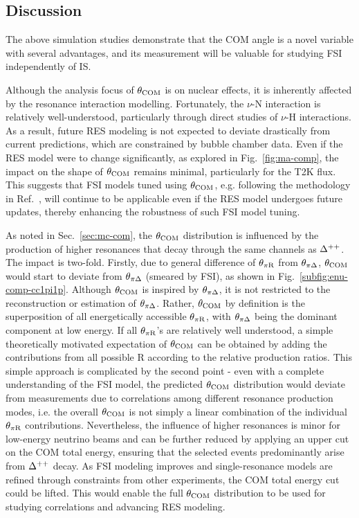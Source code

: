      \subsection{Discussion}
     \label{sec:dis}
     The above simulation studies demonstrate that the COM angle is a novel variable with several advantages, and its measurement will be valuable for studying FSI independently of IS.

     Although the analysis focus of $\theta_{\textrm{COM}}$ is on nuclear effects, it is inherently affected by the resonance interaction modelling. 
     Fortunately, the $\nu$-N interaction is relatively well-understood, particularly through direct studies of $\nu$-H interactions. 
     As a result, future RES modeling is not expected to deviate drastically from current predictions, which are constrained by bubble chamber data.
     Even if the RES model were to change significantly, as explored in Fig.~\ref{fig:ma-comp}, the impact on the shape of $\theta_{\textrm{COM}}$ remains minimal, particularly for the T2K flux.
     This suggests that FSI models tuned using $\theta_{\textrm{COM}}$, e.g. following the methodology in Ref.~\cite{GENIE:2021zuu}, will continue to be applicable even if the RES model undergoes future updates, thereby enhancing the robustness of such FSI model tuning.

     As noted in Sec.~\ref{sec:mc-com}, the $\theta_{\textrm{COM}}$ distribution is influenced by the production of higher resonances that decay through the same channels as $\Delta^{++}$.
     The impact is two-fold.
     Firstly, due to general difference of $\theta_{\pi\textrm{R}}$ from $\theta_{\pi\Delta}$, $\theta_{\textrm{COM}}$ would start to deviate from $\theta_{\pi\Delta}$ (smeared by FSI), as shown in Fig.~\ref{subfig:enu-comp-cc1pi1p}. 
     Although $\theta_{\textrm{COM}}$ is inspired by $\theta_{\pi\Delta}$, it is not restricted to the reconstruction or estimation of $\theta_{\pi\Delta}$. 
     Rather, $\theta_{\textrm{COM}}$ by definition is the superposition of all energetically accessible $\theta_{\pi\textrm{R}}$, with $\theta_{\pi\Delta}$ being the dominant component at low energy.
     If all $\theta_{\pi\textrm{R}}$'s are relatively well understood, a simple theoretically motivated expectation of $\theta_{\textrm{COM}}$ can be obtained by adding the contributions from all possible R according to the relative production ratios.
     This simple approach is complicated by the second point - even with a complete understanding of the FSI model, the predicted $\theta_{\textrm{COM}}$ distribution would deviate from measurements due to correlations among different resonance production modes, i.e. the overall $\theta_{\textrm{COM}}$ is not simply a linear combination of the individual $\theta_{\pi\textrm{R}}$ contributions.
     Nevertheless, the influence of higher resonances is minor for low-energy neutrino beams and can be further reduced by applying an upper cut on the COM total energy, ensuring that the selected events predominantly arise from $\Delta^{++}$ decay.
     As FSI modeling improves and single-resonance models are refined through constraints from other experiments, the COM total energy cut could be lifted. 
     This would enable the full $\theta_{\textrm{COM}}$ distribution to be used for studying correlations and advancing RES modeling.

